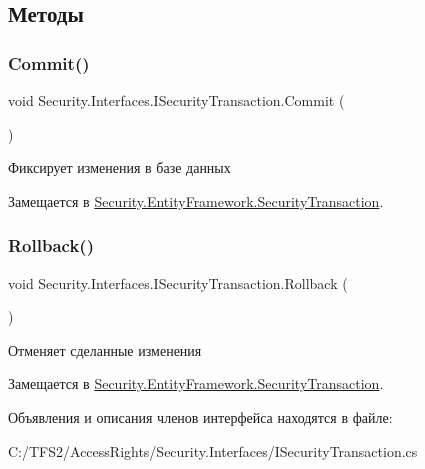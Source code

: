 \subsection{Методы}
\mbox{\label{interface_security_1_1_interfaces_1_1_i_security_transaction_a8c845571091b59511114ba3fa0613525}} 
\subsubsection{\texorpdfstring{Commit()}{Commit()}}
{\footnotesize\ttfamily void Security.\+Interfaces.\+I\+Security\+Transaction.\+Commit (\begin{DoxyParamCaption}{ }\end{DoxyParamCaption})}



Фиксирует изменения в базе данных 



Замещается в \hyperlink{class_security_1_1_entity_framework_1_1_security_transaction_a0878ace286c2f7459eecbc24331d0288}{Security.\+Entity\+Framework.\+Security\+Transaction}.

\mbox{\label{interface_security_1_1_interfaces_1_1_i_security_transaction_afc9cfbc152639e831a753cad4e62b9d9}} 
\subsubsection{\texorpdfstring{Rollback()}{Rollback()}}
{\footnotesize\ttfamily void Security.\+Interfaces.\+I\+Security\+Transaction.\+Rollback (\begin{DoxyParamCaption}{ }\end{DoxyParamCaption})}



Отменяет сделанные изменения 



Замещается в \hyperlink{class_security_1_1_entity_framework_1_1_security_transaction_a926ab5cfb24bab1a1e5ef2e057f12230}{Security.\+Entity\+Framework.\+Security\+Transaction}.



Объявления и описания членов интерфейса находятся в файле\+:\begin{DoxyCompactItemize}
\item 
C\+:/\+T\+F\+S2/\+Access\+Rights/\+Security.\+Interfaces/I\+Security\+Transaction.\+cs\end{DoxyCompactItemize}

